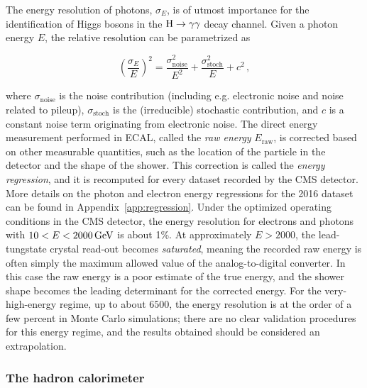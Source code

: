 The energy resolution of photons, $\sigma_E$, is of utmost importance for the identification of Higgs bosons in the $\mathrm{H}\to\mathrm{\gamma}\mathrm{\gamma}$ decay channel.
% 
Given a photon energy $E$, the relative resolution can be parametrized as~\cite{CMS:1997ysd}
% 
\begin{linenomath}
\begin{equation}
\left( \frac{\sigma_E}{E} \right)^2 =
    \frac{\sigma_\text{noise}^2}{E^2}
    + \frac{\sigma_\text{stoch}^2}{E}
    + c^2
\,,
\end{equation}
\end{linenomath}
% 
where $\sigma_\text{noise}$ is the noise contribution (including e.g. electronic noise and noise related to pileup), $\sigma_\text{stoch}$ is the (irreducible) stochastic contribution, and $c$ is a constant noise term originating from electronic noise.
% 
The direct energy measurement performed in ECAL, called the \textit{raw energy} $E_\text{raw}$, is corrected based on other measurable quantities, such as the location of the particle in the detector and the shape of the shower.
% 
This correction is called the \textit{energy regression}, and it is recomputed for every dataset recorded by the CMS detector.
% 
More details on the photon and electron energy regressions for the 2016 dataset can be found in Appendix~\ref{app:regression}.
% 
Under the optimized operating conditions in the CMS detector, the energy resolution for electrons and photons with $10 < E < 2000\,\text{GeV}$ is about 1\%.
% 
At approximately $E > 2000$\GeV, the lead-tungstate crystal read-out becomes \textit{saturated}, meaning the recorded raw energy is often simply the maximum allowed value of the analog-to-digital converter.
% 
In this case the raw energy is a poor estimate of the true energy, and the shower shape becomes the leading determinant for the corrected energy.
% 
For the very-high-energy regime, up to about $6500$\GeV, the energy resolution is at the order of a few percent in Monte Carlo simulations; there are no clear validation procedures for this energy regime, and the results obtained should be considered an extrapolation.


\subsubsection{The hadron calorimeter}

